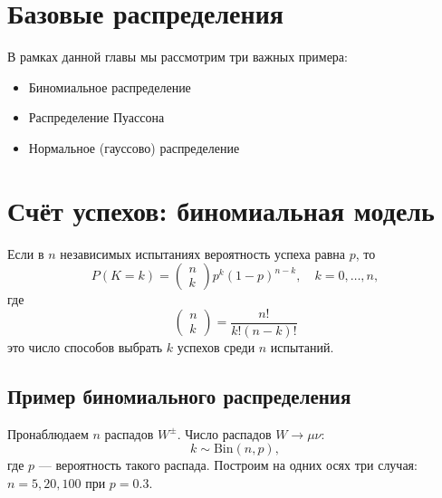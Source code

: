 \documentclass[
  russian,
  12pt,
  a4paper,
  a4paper,
  openany]{scrbook}
\begin{document}
\section{Базовые
распределения}\label{ux431ux430ux437ux43eux432ux44bux435-ux440ux430ux441ux43fux440ux435ux434ux435ux43bux435ux43dux438ux44f}

В рамках данной главы мы рассмотрим три важных примера:

\begin{itemize}
\item
  Биномиальное распределение
\item
  Распределение Пуассона
\item
  Нормальное (гауссово) распределение
\end{itemize}

\section{Счёт успехов: биномиальная
модель}\label{ux441ux447ux451ux442-ux443ux441ux43fux435ux445ux43eux432-ux431ux438ux43dux43eux43cux438ux430ux43bux44cux43dux430ux44f-ux43cux43eux434ux435ux43bux44c}

\begin{booknote}

Если в \(n\) независимых испытаниях вероятность успеха равна \(p\), то
\[P(K=k)=\begin{pmatrix} n\\k\end{pmatrix}p^k(1-p)^{n-k}, \quad k=0,\dots,n,\]
где \[\begin{pmatrix} n\\k\end{pmatrix}=\frac{n!}{k!(n-k)!}\] это число
способов выбрать \(k\) успехов среди \(n\) испытаний.

\end{booknote}

\subsection{Пример биномиального
распределения}\label{ux43fux440ux438ux43cux435ux440-ux431ux438ux43dux43eux43cux438ux430ux43bux44cux43dux43eux433ux43e-ux440ux430ux441ux43fux440ux435ux434ux435ux43bux435ux43dux438ux44f}

Пронаблюдаем \(n\) распадов \(W^{\pm}\). Число распадов \(W\to\mu\nu\):
\[k\sim\mathrm{Bin}(n,p),\] где \(p\) --- вероятность такого распада.
Построим на одних осях три случая: \(n=5,20,100\) при \(p=0.3\).
\end{document}
